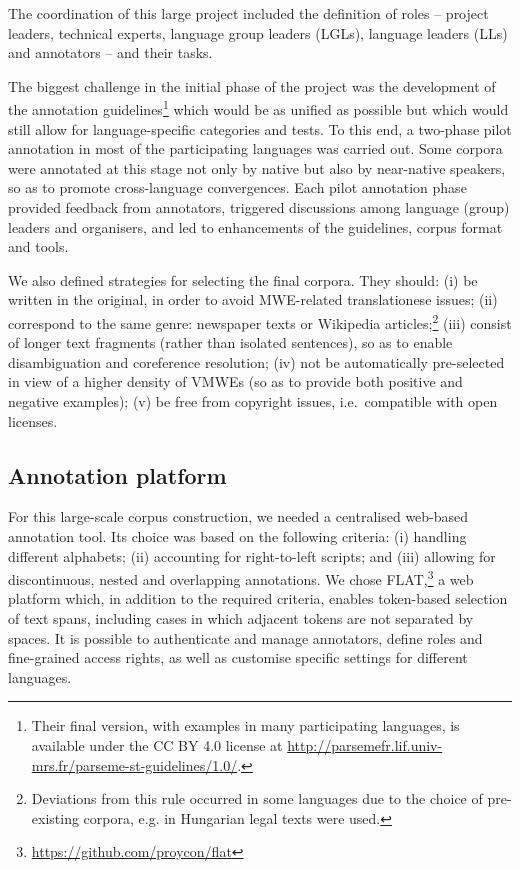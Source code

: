 \documentclass[output=paper,
modfonts,
]{langscibook}
\begin{document}
The coordination of this large project included the definition of roles -- project leaders, technical experts, language group leaders (LGLs), language leaders (LLs) and annotators -- and their tasks.

The biggest challenge in the initial phase of the project was the development of the annotation guidelines\footnote{Their final version, with examples in many participating languages, is available under the CC BY 4.0 license at %
\url{http://parsemefr.lif.univ-mrs.fr/parseme-st-guidelines/1.0/}.} which would be as unified as possible but which would still allow for language-specific categories and tests. To this end, a two-phase pilot annotation in most of the participating languages was carried out. Some corpora were annotated at this stage not only by native but also by near-native speakers, so as to promote cross-language convergences. Each pilot annotation phase provided feedback from annotators, triggered discussions among language (group) leaders and organisers, and led to enhancements of the guidelines, corpus format and tools. 

We also defined strategies for selecting the final corpora. They should: (i) be written in the original, 
 in order to avoid  MWE-related translationese issues; (ii) correspond to the same genre: newspaper texts or Wikipedia articles;\footnote{Deviations from this rule occurred in some languages due to the choice of pre-existing corpora, e.g. in Hungarian legal texts were used.} (iii) consist of longer text fragments (rather than isolated sentences), so as to enable disambiguation and coreference resolution; (iv) not be automatically pre-selected in view of a higher density of VMWEs (so as to provide both positive and negative examples); (v) be free from copyright issues, i.e.\ compatible with open licenses. 

\subsection{Annotation platform}
\label{sec:flat}
%
For this large-scale corpus construction, we needed a centralised web-based annotation tool. Its choice was based on the
following criteria: (i) handling different alphabets; (ii) accounting for right-to-left scripts; and (iii) allowing for
discontinuous, nested and overlapping annotations. We chose
FLAT,\footnote{\scriptsize\url{https://github.com/proycon/flat}} a web platform which, in addition to the required criteria, enables token-based selection of text spans,
including cases in which adjacent tokens are not separated by spaces. It is possible to authenticate and manage
annotators, define roles and fine-grained access rights, as well as customise specific settings for different languages.
\end{document}
